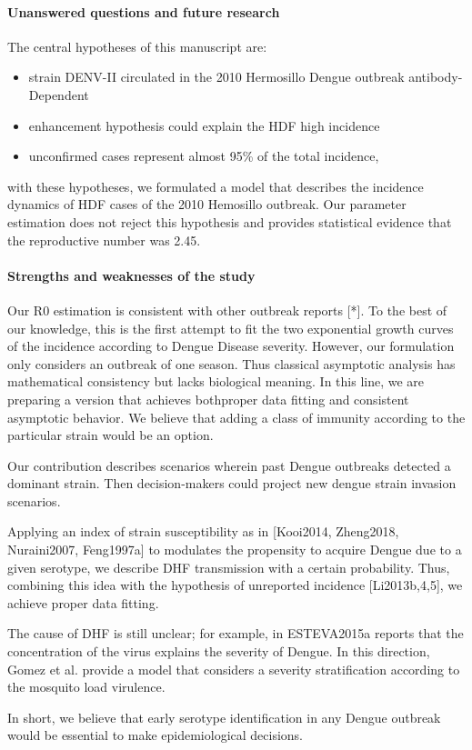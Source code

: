     \paragraph{Unanswered questions and future research}


        The central hypotheses of this manuscript are: 
        
    \begin{itemize}
        \item
            strain DENV-II
            circulated in the 2010 Hermosillo Dengue outbreak 
            antibody-Dependent
        \item
            enhancement hypothesis could explain the HDF high incidence
        \item
            unconfirmed cases represent almost \num{95}\% 
            of the total incidence,        
    \end{itemize}
    with these hypotheses, we formulated a model that 
    describes the incidence dynamics of HDF cases of the 
    \num{2010} Hemosillo outbreak. Our parameter estimation does not reject
    this hypothesis and  provides statistical evidence that the reproductive 
    number was \num{2.45}.

    \paragraph{Strengths and weaknesses of the study} 
    Our R0 estimation is consistent with other outbreak reports [*].
    To the best of our knowledge, this is the first attempt to fit the 
    two exponential growth curves of the incidence according to Dengue 
    Disease severity. However, our formulation only considers an outbreak
    of one season. Thus classical asymptotic analysis has mathematical 
    consistency but lacks biological meaning.  In this line, we are preparing
    a version that achieves both\textemdash proper data fitting and consistent
    asymptotic behavior. We believe that adding a class of immunity according
    to the particular strain would be an option.

        Our contribution describes scenarios wherein past Dengue
    outbreaks detected a dominant  strain. Then decision-makers could
    project new dengue strain invasion scenarios.
     
        Applying an index of strain susceptibility as in  [Kooi2014,
    Zheng2018, Nuraini2007, Feng1997a] to modulates the propensity to
    acquire Dengue due to a given serotype,  we describe DHF transmission
    with a certain probability.  Thus, combining this idea with the
    hypothesis of unreported incidence [Li2013b,4,5], we achieve proper
    data fitting. 

        The cause of DHF is still unclear; for example, in ESTEVA2015a reports
    that the concentration of the virus explains the severity of Dengue.
    In this direction, Gomez et al. provide a model that considers a
    severity stratification according to the mosquito load virulence.

        In short, we believe that early serotype identification in any Dengue
    outbreak would be essential to  make epidemiological decisions.
